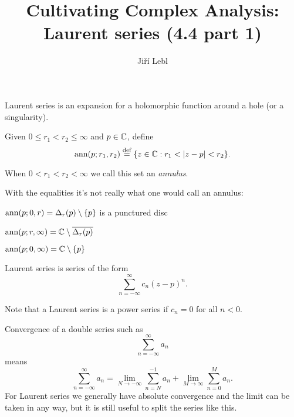 \documentclass[10pt,aspectratio=169]{beamer}
\author{Ji\v{r}\'i Lebl}
\institute[OSU]{%
Departemento pri Matematiko de Oklahoma {\^S}tata Universitato}
\title{Cultivating Complex Analysis:\\%
Laurent series (4.4 part 1)}
\date{}
\begin{document}
\begin{frame}
\titlepage
\end{frame}

\begin{frame}
Laurent series is an expansion for a holomorphic function around a
hole (or a singularity).

\pause
\medskip

Given $0 \leq r_1 < r_2 \leq \infty$ and $p \in {\mathbb{C}}$, define
\begin{equation*}
\operatorname{ann}(p;r_1,r_2)
\overset{\text{def}}{=}
\{ z \in {\mathbb{C}} : r_1 < \lvert {z - p} \rvert < r_2 \} .
\end{equation*}

\pause

When $0 < r_1 < r_2 < \infty$ we call this set an \emph{annulus}.

\medskip
\pause

With the equalities it's not really what one would call an annulus:

\medskip
\pause

$\operatorname{ann}(p;0,r) = \Delta_r(p) \setminus \{ p \}$ is a punctured disc

\medskip
\pause

$\operatorname{ann}(p;r,\infty) = {\mathbb{C}} \setminus \overline{\Delta_r(p)}$

\medskip
\pause

$\operatorname{ann}(p;0,\infty) = {\mathbb{C}} \setminus \{ p \}$
\end{frame}

\begin{frame}
Laurent series is series of the form
\[
\sum_{n=-\infty}^{\infty} c_n {(z-p)}^n .
\]

\pause

Note that a Laurent series is a power series if $c_n=0$ for all $n < 0$.

\medskip
\pause

Convergence of a double series such as
\[
\sum_{n=-\infty}^{\infty} a_n
\]
means
\[
\sum_{n=-\infty}^{\infty} a_n
=
\lim_{N\to -\infty}
\sum_{n=N}^{-1} a_n
+
\lim_{M\to \infty}
\sum_{n=0}^{M} a_n .
\]
\pause
For Laurent series we generally have absolute convergence and
the limit can be taken in any way, but it is still useful to split
the series like this.
\end{frame}
\end{document}
